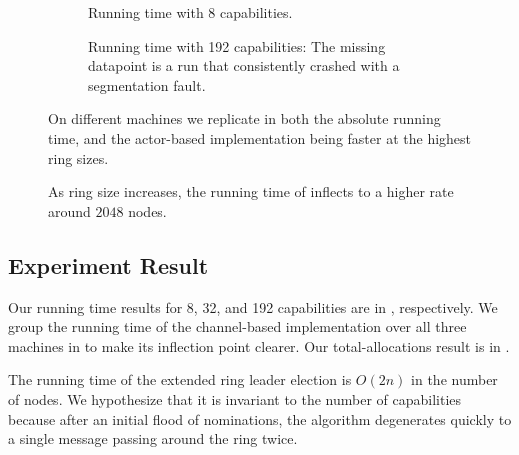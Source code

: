 \documentclass[sigplan,screen]{acmart}
\begin{document}
\begin{figure}
    \begin{subfigure}{\linewidth}
    {\small
        \def\svgwidth{\linewidth}
        
    }
    \caption{Running time with 8 capabilities.}
    \label{fig:perf-eval-time-n8}
    \end{subfigure}

    \begin{subfigure}{\linewidth}
    {\small
        \def\svgwidth{\linewidth}
        
    }
    \caption{
        Running time with 192 capabilities:
        The missing datapoint is a run that consistently crashed with a segmentation fault.
    }
    \label{fig:perf-eval-time-n192}
    \end{subfigure}

\caption{
    On different machines we replicate
     in both the absolute running time, and
    the actor-based implementation being faster at the highest
    ring sizes.
}
\label{fig:perf-eval-time-rest}
\end{figure}

\begin{figure}
    {\small
        \def\svgwidth{\linewidth}
        
    }
    \caption{
        As ring size increases,
        the running time of 
        inflects to a higher rate around $2048$ nodes.
    }
    \label{fig:perf-group-chan}
\end{figure}

\subsection{Experiment Result}
\label{apx:exp-result}

Our running time results for 8, 32, and 192 capabilities are in
,
respectively.
%
We group the running time of the channel-based implementation over all three
machines in  to make its inflection point clearer.
%
Our total-allocations result is in .

The running time of the extended ring leader election is $O(2n)$ in the number
of nodes.
%
We hypothesize that it is invariant to the number of capabilities because after
an initial flood of nominations, the algorithm degenerates quickly to a single
message passing around the ring twice.
\end{document}
